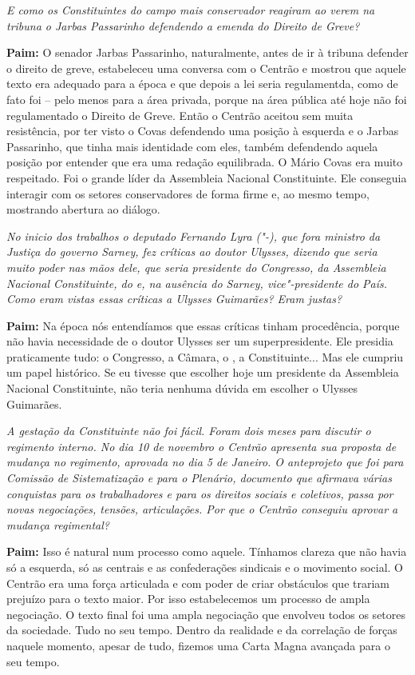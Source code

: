 \emph{E como os Constituintes do campo mais conservador reagiram ao
verem na tribuna o Jarbas Passarinho defendendo a emenda do Direito de
Greve?}

\textbf{Paim:} O senador Jarbas Passarinho, naturalmente, antes de ir à
tribuna defender o direito de greve, estabeleceu uma conversa com o
Centrão e mostrou que aquele texto era adequado para a época e que
depois a lei seria regulamentda, como de fato foi -- pelo menos para a
área privada, porque na área pública até hoje não foi regulamentado o
Direito de Greve. Então o Centrão aceitou sem muita resistência, por ter
visto o Covas defendendo uma posição à esquerda e o Jarbas Passarinho,
que tinha mais identidade com eles, também defendendo aquela posição por
entender que era uma redação equilibrada. O Mário Covas era muito
respeitado. Foi o grande líder da Assembleia Nacional Constituinte. Ele
conseguia interagir com os setores conservadores de forma firme e, ao
mesmo tempo, mostrando abertura ao diálogo.

\emph{No inicio dos trabalhos o deputado Fernando Lyra ("-), que
fora ministro da Justiça do governo Sarney, fez críticas ao doutor
Ulysses, dizendo que seria muito poder nas mãos dele, que seria
presidente do Congresso, da Assembleia Nacional Constituinte, do  e,
na ausência do Sarney, vice"-presidente do País. Como eram vistas essas
críticas a Ulysses Guimarães? Eram justas?}

\textbf{Paim:} Na época nós entendíamos que essas críticas tinham
procedência, porque não havia necessidade de o doutor Ulysses ser um
superpresidente. Ele presidia praticamente tudo: o Congresso, a Câmara,
o , a Constituinte... Mas ele cumpriu um papel histórico. Se eu
tivesse que escolher hoje um presidente da Assembleia Nacional
Constituinte, não teria nenhuma dúvida em escolher o Ulysses Guimarães.

\emph{A gestação da Constituinte não foi fácil. Foram dois meses para
discutir o regimento interno. No dia 10 de novembro o Centrão apresenta
sua proposta de mudança no regimento, aprovada no dia 5 de Janeiro. O
anteprojeto que foi para Comissão de Sistematização e para o Plenário,
documento que afirmava várias conquistas para os trabalhadores e para os
direitos sociais e coletivos, passa por novas negociações, tensões,
articulações. Por que o Centrão conseguiu aprovar a mudança regimental?}

\textbf{Paim:} Isso é natural num processo como aquele. Tínhamos clareza
que não havia só a esquerda, só as centrais e as confederações sindicais
e o movimento social. O Centrão era uma força articulada e com poder de
criar obstáculos que trariam prejuízo para o texto maior. Por isso
estabelecemos um processo de ampla negociação. O texto final foi uma
ampla negociação que envolveu todos os setores da sociedade. Tudo no seu
tempo. Dentro da realidade e da correlação de forças naquele momento,
apesar de tudo, fizemos uma Carta Magna avançada para o seu tempo.

